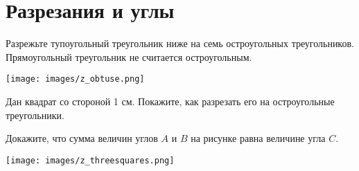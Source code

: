 \section{Разрезания и углы}
\begin{itemize}

\itA Разрежьте тупоугольный треугольник ниже на семь остроугольных треугольников. Прямоугольный треугольник не считается остроугольным.

\vspace{-0.6cm}
\begin{center}
\texttt{[image: images/z\_obtuse.png]}
\end{center} \vspace{-0.7cm}

\itB Дан квадрат со стороной 1 см. Покажите, как разрезать его на остроугольные треугольники.

\itC Докажите, что сумма величин углов $A$ и $B$ на рисунке равна величине угла $C$.

\vspace{-0.4cm}
\begin{center}
\texttt{[image: images/z\_threesquares.png]}
\end{center} \vspace{-0.4cm}
\end{itemize}